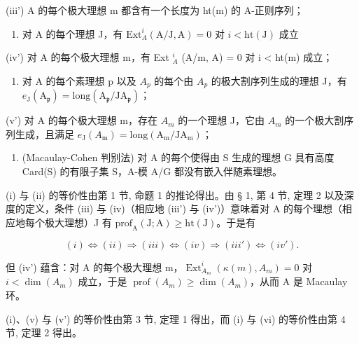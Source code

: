 (iii') A 的每个极大理想 m 都含有一个长度为 ht(m) 的 A-正则序列；

\begin{enumerate}
\def\labelenumi{(\roman{enumi})}
\setcounter{enumi}{3}
\tightlist
\item
  对 A 的每个理想 J，有 \(\mathrm{Ext}_A^i (\mathrm{A} / \mathrm{J},\mathrm{A}) = 0\) 对 \(i <   \mathrm{ht}(\mathrm{J})\) 成立
\end{enumerate}

(iv') 对 A 的每个极大理想 m，有 Ext \(_{A}^{i}\) (A/m, A) = 0 对 i \textless{} ht(m) 成立；

\begin{enumerate}
\def\labelenumi{(\alph{enumi})}
\setcounter{enumi}{21}
\tightlist
\item
  对 A 的每个素理想 p 以及 \(A_{p}\) 的每个由 \(A_{p}\) 的极大割序列生成的理想 J，有 \(e_{\mathrm{J}}(\mathrm{A}_{\mathfrak{p}})=\mathrm{long}(\mathrm{A}_{\mathfrak{p}}/\mathrm{JA}_{\mathfrak{p}})\)；
\end{enumerate}

(v') 对 A 的每个极大理想 m，存在 \(A_{m}\) 的一个理想 J，它由 \(A_{m}\) 的一个极大割序列生成，且满足 \(e_{\mathrm{J}}(A_{\mathrm{m}})=\mathrm{long}(\mathrm{A}_{\mathrm{m}}/\mathrm{JA}_{\mathrm{m}})\)；

\begin{enumerate}
\def\labelenumi{(\roman{enumi})}
\setcounter{enumi}{5}
\tightlist
\item
  (Macaulay-Cohen 判别法) 对 A 的每个使得由 S 生成的理想 G 具有高度 Card(S) 的有限子集 S，A-模 A/G 都没有嵌入伴随素理想。
\end{enumerate}

(i) 与 (ii) 的等价性由第 1 节, 命题 1 的推论得出。由 § 1, 第 4 节, 定理 2 以及深度的定义，条件 (iii) 与 (iv)（相应地 (iii') 与 (iv')）意味着对 A 的每个理想（相应地每个极大理想）J 有 \(\mathrm{prof}_{\mathrm{A}}(\mathrm{J};\mathrm{A})\geqslant \mathrm{ht}(\mathrm{J})\)。于是有

\[
(i) \Leftrightarrow (ii) \Rightarrow (iii) \Leftrightarrow (iv) \Rightarrow (iii') \Leftrightarrow (iv').
\]

但 (iv') 蕴含：对 A 的每个极大理想 m，\(\operatorname{Ext}_{A_{m}}^{i}(\kappa(m), A_{m}) = 0\) 对 \(i < \dim(A_{m})\) 成立，于是 \(\operatorname{prof}(A_{m}) \geqslant \dim(A_{m})\)，从而 A 是 Macaulay 环。

(i)、(v) 与 (v') 的等价性由第 3 节, 定理 1 得出，而 (i) 与 (vi) 的等价性由第 4 节, 定理 2 得出。

